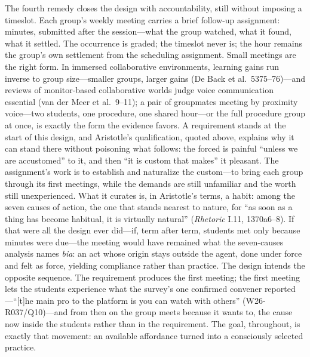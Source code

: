 The fourth remedy closes the design with accountability, still without
imposing a timeslot. Each group's weekly meeting carries a brief
follow-up assignment: minutes, submitted after the session---what the
group watched, what it found, what it settled. The occurrence is
graded; the timeslot never is; the hour remains the group's own
settlement from the scheduling assignment. Small meetings are the
right form. In immersed collaborative environments, learning gains run
inverse to group size---smaller groups, larger gains (De Back et al.\
5375--76)---and reviews of monitor-based collaborative worlds judge
voice communication essential (van der Meer et al.\ 9--11); a pair of
groupmates meeting by proximity voice---two students, one procedure,
one shared hour---or the full procedure group at once, is exactly the
form the evidence favors. A requirement stands at the start of this
design, and Aristotle's qualification, quoted above, explains why it
can stand there without poisoning what follows: the forced is painful
``unless we are accustomed'' to it, and then ``it is custom that
makes'' it pleasant. The assignment's work is to establish and naturalize the custom---to
bring each group through its first meetings, while the demands are
still unfamiliar and the worth still unexperienced. What it curates
is, in Aristotle's terms, a habit: among the seven causes of action,
the one that stands nearest to nature, for ``as soon as a thing has
become habitual, it is virtually natural'' (\textit{Rhetoric} I.11,
1370a6--8). If that were all
the design ever did---if, term after term, students met only because
minutes were due---the meeting would have remained what the
seven-causes analysis names \textit{bia}: an act whose origin stays
outside the agent, done under force and felt as force, yielding
compliance rather than practice. The design intends the opposite
sequence. The requirement produces the first meeting; the first
meeting lets the students experience what the survey's one confirmed
convener reported---``[t]he main pro to the platform is you can watch
with others'' (W26-R037/Q10)---and from then on the group meets
because it wants to, the cause now inside the students rather than in
the requirement. The goal, throughout, is exactly that movement: an
available affordance turned into a consciously selected practice.

